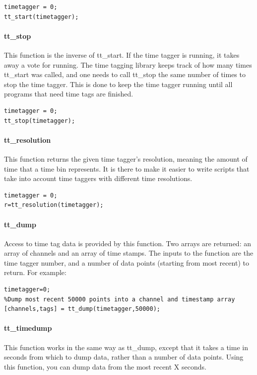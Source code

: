 \documentclass[10pt]{article}
\begin{document}
\begin{verbatim}
timetagger = 0;
tt_start(timetagger);
\end{verbatim}

\paragraph{tt\_stop}
This function is the inverse of tt\_start. If the time tagger is running, it takes away a vote
for running. The time tagging library keeps track of how many times tt\_start was called, and
one needs to call tt\_stop the same number of times to stop the time tagger. This is done to keep the time tagger
running until all programs that need time tags are finished.

\begin{verbatim}
timetagger = 0;
tt_stop(timetagger);
\end{verbatim}

\paragraph{tt\_resolution}
This function returns the given time tagger's resolution, meaning the amount of time that a time bin represents.
It is there to make it easier to write scripts that take into account time taggers with different time resolutions.

\begin{verbatim}
timetagger = 0;
r=tt_resolution(timetagger);
\end{verbatim}

\paragraph{tt\_dump}
Access to time tag data is provided by this function. Two arrays are returned:
an array of channels and an array of time stamps. The inputs to the function are the time tagger number,
and a number of data points (starting from most recent) to return. For example:

\begin{verbatim}
timetagger=0;
%Dump most recent 50000 points into a channel and timestamp array
[channels,tags] = tt_dump(timetagger,50000);
\end{verbatim}

\paragraph{tt\_timedump}
This function works in the same way as tt\_dump, except that it takes a time in seconds
from which to dump data, rather than a number of data points. Using this function, you can dump
data from the most recent X seconds.
\end{document}
